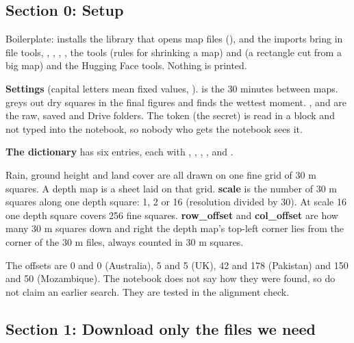 
\subsection{Section 0: Setup}

Boilerplate:  installs the library that opens  map files (), and the imports bring in file tools, , , , , the  tools  (rules for shrinking a map) and  (a rectangle cut from a big map) and the Hugging Face tools. Nothing is printed.

\textbf{Settings} (capital letters mean fixed values, ).  is the 30 minutes between maps.  greys out dry squares in the final figures and  finds the wettest moment. ,  and  are the raw, saved and Drive folders. The token (the  secret) is read in a  block and not typed into the notebook, so nobody who gets the notebook sees it.

\textbf{The  dictionary} has six entries, each with , , , ,  and .

\begin{plainbox}
Rain, ground height and land cover are all drawn on one fine grid of 30 m squares. A depth map is a sheet laid on that grid. \textbf{scale} is the number of 30 m squares along one depth square: 1, 2 or 16 (resolution divided by 30). At scale 16 one depth square covers 256 fine squares. \textbf{row\_offset} and \textbf{col\_offset} are how many 30 m squares down and right the depth map's top-left corner lies from the corner of the 30 m files, always counted in 30 m squares.
\end{plainbox}

The offsets are 0 and 0 (Australia), 5 and 5 (UK), 42 and 178 (Pakistan) and 150 and 50 (Mozambique). The notebook does not say how they were found, so do not claim an earlier search. They are tested in the alignment check.

\subsection{Section 1: Download only the files we need}

